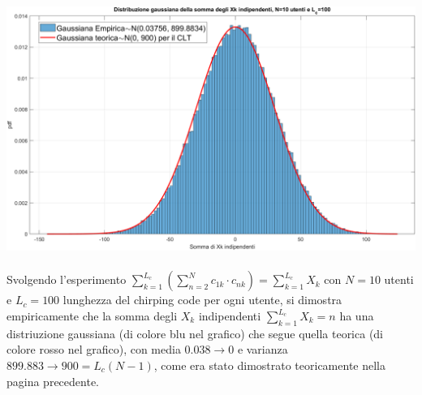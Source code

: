 \begin{adjustbox}{width=.95\paperwidth, center}
	\includegraphics{images/distribuzioneGaussianaEmpTh.png}
\end{adjustbox}\\\\
Svolgendo l'esperimento \( \sum_{k=1}^{L_c}\left(\sum_{n=2}^{N}c_{1k}\cdot c_{nk}\right)
= \sum_{k=1}^{L_c}X_k \) con \(N=10\) utenti e \(L_c=100\) lunghezza del chirping code per ogni utente, si dimostra empiricamente che la somma degli \(X_k\) indipendenti \( \sum_{k=1}^{L_c}X_k = n \) ha una distriuzione gaussiana (di colore blu nel grafico) che segue quella teorica (di colore rosso nel grafico), con media \(0.038 \to 0\) e varianza \(899.883 \to 900=L_c(N-1)\), come era stato dimostrato teoricamente nella pagina precedente.